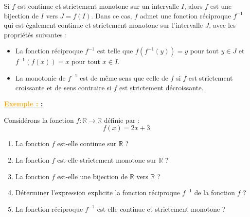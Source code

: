 \documentclass[12pt]{article}
\newcounter{exemple}
\newcommand{\exemple}{%
  \refstepcounter{exemple}%
  \textbf{\textcolor{orange}{Exemple \theexemple : }} \ignorespaces
}
\begin{document}
\begin{enumerate}[label=\arabic*)]
Si \( f \) est continue et strictement monotone sur un intervalle \( I \), alors \( f \) est une bijection de \( I \) vers \( J = f(I) \). Dans ce cas, \( f \) admet une fonction réciproque \( f^{-1} \) qui est également continue et strictement monotone sur l'intervalle \( J \), avec les propriétés suivantes :
\begin{itemize}
    \item La fonction réciproque \( f^{-1} \) est telle que \( f(f^{-1}(y)) = y \) pour tout \( y \in J \) et \( f^{-1}(f(x)) = x \) pour tout \( x \in I \).
    \item La monotonie de \( f^{-1} \) est de même sens que celle de \( f \) si \( f \) est strictement croissante et de sens contraire si \( f \) est strictement décroissante.
\end{itemize}

			\textbf{\underline{\exemple:}}

Considérons la fonction \( f : \mathbb{R} \to \mathbb{R} \) définie par :
\[
f(x) = 2x + 3
\]

\begin{enumerate}
    \item La fonction \( f \) est-elle continue sur \(\mathbb{R}\) ?
    \item La fonction \( f \) est-elle strictement monotone sur \(\mathbb{R}\) ?
    \item La fonction \( f \) est-elle une bijection de \(\mathbb{R}\) vers \(\mathbb{R}\) ?
    \item Déterminer l'expression explicite la fonction réciproque \( f^{-1} \) de la fonction \( f \) ?
    \item La fonction réciproque \( f^{-1} \) est-elle continue et strictement monotone ?
\end{enumerate}


\end{enumerate}
\end{document}
